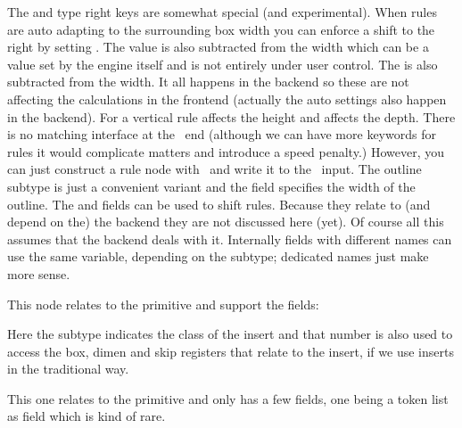 The  and type {right} keys are somewhat special (and experimental).
When rules are auto adapting to the surrounding box width you can enforce a shift
to the right by setting . The value is also subtracted from the width
which can be a value set by the engine itself and is not entirely under user
control. The  is also subtracted from the width. It all happens in
the backend so these are not affecting the calculations in the frontend (actually
the auto settings also happen in the backend). For a vertical rule 
affects the height and  affects the depth. There is no matching
interface at the \TEX\ end (although we can have more keywords for rules it would
complicate matters and introduce a speed penalty.) However, you can just
construct a rule node with \LUA\ and write it to the \TEX\ input. The \type
{outline} subtype is just a convenient variant and the  field
specifies the width of the outline. The  and 
fields can be used to shift rules. Because they relate to (and depend on the) the
backend they are not discussed here (yet). Of course all this assumes that the
backend deals with it. Internally fields with different names can use the same
variable, depending on the subtype; dedicated names just make more sense.


\stopsubsection

\startsubsection[title={insert}]

This node relates to the \type {\insert} primitive and support the fields:


Here the subtype indicates the class of the insert and that number is also used
to access the box, dimen and skip registers that relate to the insert, if we
use inserts in the traditional way.


\stopsubsection

\startsubsection[title={mark}]

This one relates to the \type {\marks} primitive and only has a few fields, one
being a token list as field which is kind of rare.



\stopsubsection

\startsubsection[title={adjust}]

